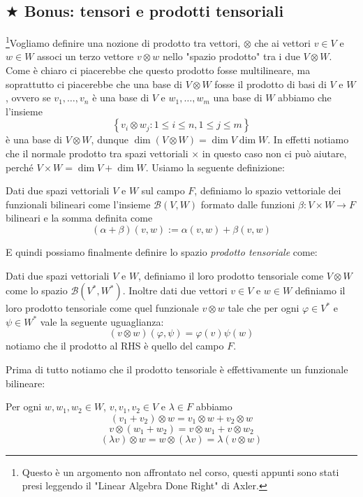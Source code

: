 \documentclass[11pt]{scrartcl}
\begin{document}
   	 \subsection{$\bigstar$ Bonus: tensori e prodotti tensoriali}
   	 \footnote{Questo è un argomento non affrontato nel corso, questi appunti sono stati presi leggendo il "Linear Algebra Done Right" di Axler.}Vogliamo definire una nozione di prodotto tra vettori, $\otimes$ che ai vettori $v\in V$ e $w\in W$ associ un terzo vettore $v\otimes w$ nello "spazio prodotto" tra i due $V\otimes W$. Come è chiaro ci piacerebbe che questo prodotto fosse multilineare, ma soprattutto ci piacerebbe che una base di $V\otimes W$ fosse il prodotto di basi di $V$ e $W$, ovvero se $v_1,\dots,v_n$ è una base di $V$ e $w_1,\dots,w_m$ una base di $W$ abbiamo che l'insieme
   	 $$\left\{v_i\otimes w_j:1\le i\le n,1\le j \le m\right\}$$
   	 è una base di $V\otimes W$, dunque $\dim\left(V\otimes W\right)=\dim V \dim W$. In effetti notiamo che il normale prodotto tra spazi vettoriali $\times$ in questo caso non ci può aiutare, perché $V\times W = \dim V +\dim W$. Usiamo la seguente definizione:
   	 \begin{definition}
   	 	Dati due spazi vettoriali $V$ e $W$ sul campo $F$, definiamo lo spazio vettoriale dei funzionali bilineari come l'insieme $\mathcal{B}(V,W)$ formato dalle funzioni $\beta:V\times W\to F$ bilineari e la somma definita come
   	 	$$(\alpha+\beta)(v,w):=\alpha(v,w)+\beta(v,w)$$
   	 \end{definition}
   	 E quindi possiamo finalmente definire lo spazio \textit{prodotto tensoriale} come:
   	 \begin{definition}
   	 	Dati due spazi vettoriali $V$ e $W$, definiamo il loro prodotto tensoriale come $V\otimes W$ come lo spazio $\mathcal{B}(V^*,W^*)$. Inoltre dati due vettori $v\in V$ e $w\in W$ definiamo il loro prodotto tensoriale come quel funzionale $v\otimes w$ tale che per ogni $\varphi\in V^*$ e $\psi\in W^*$ vale la seguente uguaglianza:
   	 	$$\left(v\otimes w\right)\left(\varphi,\psi\right)=\varphi(v)\psi(w)$$
   	 	notiamo che il prodotto al RHS è quello del campo $F$.
   	 \end{definition}
   	 Prima di tutto notiamo che il prodotto tensoriale è effettivamente un funzionale bilineare:
   	 \begin{lemma}
   	 	Per ogni $w,w_1,w_2\in W$, $v,v_1,v_2\in V$ e $\lambda\in F$ abbiamo
   	 	$$\left(v_1+v_2\right)\otimes w = v_1\otimes w + v_2 \otimes w$$
   	 	$$v\otimes \left(w_1+w_2\right)=v\otimes w_1+v\otimes w_2 $$ 
   	 	$$\left(\lambda v\right)\otimes w = w\otimes \left(\lambda v\right)=\lambda\left(v\otimes w\right)$$
   	 \end{lemma}
\end{document}
